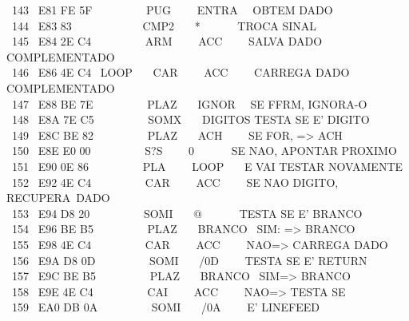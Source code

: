\documentclass[a4paper,12pt]{article}
\begin{document}
\phantom \ 143 \ E81 FE 5F \ \ \ \ \ \ \ \ \ PUG \ \ \ \ ENTRA \ \ OBTEM DADO\\
\phantom \ 144 \ E83 83 \ \ \ \ \ \ \ \ \ \ \ \ CMP2 \ \ \ * \ \ \ \ \ \ TROCA SINAL\\
\phantom \ 145 \ E84 2E C4 \ \ \ \ \ \ \ \ \ ARM \ \ \ \ ACC \ \ \ \ SALVA DADO COMPLEMENTADO\\
\phantom \ 146 \ E86 4E C4 \ LOOP \ \ \ CAR \ \ \ \ ACC \ \ \ \ CARREGA DADO COMPLEMENTADO\\
\phantom \ 147 \ E88 BE 7E \ \ \ \ \ \ \ \ \ PLAZ \ \ \ IGNOR \ \ SE FFRM, IGNORA-O\\
\phantom \ 148 \ E8A 7E C5 \ \ \ \ \ \ \ \ \ SOMX \ \ \ DIGITOS TESTA SE E' DIGITO\\
\phantom \ 149 \ E8C BE 82 \ \ \ \ \ \ \ \ \ PLAZ \ \ \ ACH \ \ \ \ SE FOR, => ACH\\
\phantom \ 150 \ E8E E0 00 \ \ \ \ \ \ \ \ \ S?S \ \ \ \ 0 \ \ \ \ \ \ SE NAO, APONTAR PROXIMO\\
\phantom \ 151 \ E90 0E 86 \ \ \ \ \ \ \ \ \ PLA \ \ \ \ LOOP \ \ \ E VAI TESTAR NOVAMENTE\\
\phantom \ 152 \ E92 4E C4 \ \ \ \ \ \ \ \ \ CAR \ \ \ \ ACC \ \ \ \ SE NAO DIGITO, RECUPERA\,\,\,DADO\\
\phantom \ 153 \ E94 D8 20 \ \ \ \ \ \ \ \ \ SOMI \ \ \ @ \ \ \ \ \ \ TESTA SE E' BRANCO\\
\phantom \ 154 \ E96 BE B5 \ \ \ \ \ \ \ \ \ PLAZ \ \ \ BRANCO \ SIM: => BRANCO\\
\phantom \ 155 \ E98 4E C4 \ \ \ \ \ \ \ \ \ CAR \ \ \ \ ACC \ \ \ \ NAO=> CARREGA DADO\\
\phantom \ 156 \ E9A D8 0D \ \ \ \ \ \ \ \ \ SOMI \ \ \ /0D \ \ \ \ TESTA SE E' RETURN\\
\phantom \ 157 \ E9C BE B5 \ \ \ \ \ \ \ \ \ PLAZ \ \ \ BRANCO \ SIM=> BRANCO\\
\phantom \ 158 \ E9E 4E C4 \ \ \ \ \ \ \ \ \ CAI \ \ \ \ ACC \ \ \ \ NAO=> TESTA SE\\
\phantom \ 159 \ EA0 DB 0A \ \ \ \ \ \ \ \ \ SOMI \ \ \ /0A \ \ \ \ E' LINEFEED

\newpage
\end{document}
